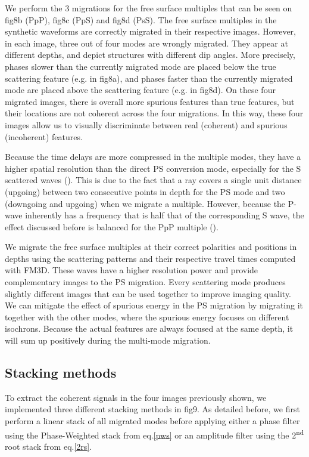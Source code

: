 \documentclass[10pt,a4paper]{article}
\numberwithin{equation}{section}
\DeclareRobustCommand{\rq}[1]{{\sethlcolor{myblue}\hl{#1}}}
\begin{document}
We perform the 3 migrations for the free surface multiples that can be seen on fig8b (PpP), fig8c (PpS) and fig8d (PsS).
The free surface multiples in the synthetic waveforms are correctly migrated in their respective images.
However, in each image, three out of four modes are wrongly migrated. 
They appear at different depths, and depict structures with different dip angles.
More precisely, phases slower than the currently migrated mode are placed below the true scattering feature (e.g. in fig8a), and phases faster than the currently migrated mode are placed above the scattering feature (e.g. in fig8d).
On these four migrated images, there is overall more spurious features than true features, but their locations are not coherent across the four migrations.
In this way, these four images allow us to visually discriminate between real (coherent) and spurious (incoherent) features.

Because the time delays are more compressed in the multiple modes, they have a higher spatial resolution than the direct PS conversion mode, especially for the S scattered waves (\cite{rond_sgeo_09}).
This is due to the fact that a ray covers a single unit distance (upgoing) between two consecutive points in depth for the PS mode and two (downgoing and upgoing) when we migrate a multiple.
However, because the P-wave inherently has a frequency that is half that of the corresponding S wave, the effect discussed before is balanced for the PpP multiple (\cite{rond_sgeo_09}).

We migrate the free surface multiples at their correct polarities and positions in depths using the scattering patterns and their respective travel times computed with FM3D.
These waves have a higher resolution power and provide complementary images to the PS migration.
Every scattering mode produces slightly different images that can be used together to improve imaging quality.
We can mitigate the effect of spurious energy in the PS migration by migrating it together with the other modes, where the spurious energy focuses on different isochrons.
Because the actual features are always focused at the same depth, it will sum up positively during the multi-mode migration.

\subsection{Stacking methods}

To extract the coherent signals in the four images previously shown, we implemented three different stacking methods in fig9.
As detailed before, we first perform a linear stack of all migrated modes before applying either a phase filter using the Phase-Weighted stack from eq.\eqref{pws} or an amplitude filter using the 2\textsuperscript{nd} root stack from eq.\eqref{2rs}.
\end{document}
